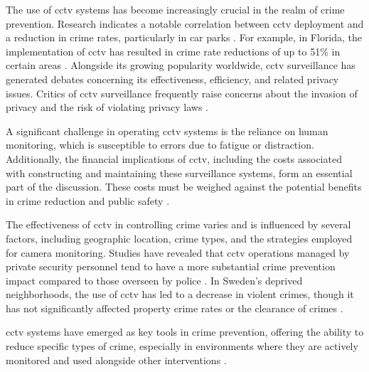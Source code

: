 The use of \ac{cctv} systems has become increasingly crucial in the realm of crime prevention. Research indicates a notable correlation between \ac{cctv} deployment and a reduction in crime rates, particularly in car parks \cite{rfc33}. For example, in Florida, the implementation of \ac{cctv} has resulted in crime rate reductions of up to 51\% in certain areas \cite{rfc34}. Alongside its growing popularity worldwide, \ac{cctv} surveillance has generated debates concerning its effectiveness, efficiency, and related privacy issues. Critics of \ac{cctv} surveillance frequently raise concerns about the invasion of privacy and the risk of violating privacy laws \cite{rfc38}.

A significant challenge in operating \ac{cctv} systems is the reliance on human monitoring, which is susceptible to errors due to fatigue or distraction. Additionally, the financial implications of \ac{cctv}, including the costs associated with constructing and maintaining these surveillance systems, form an essential part of the discussion. These costs must be weighed against the potential benefits in crime reduction and public safety \cite{rfc38}. 

The effectiveness of \ac{cctv} in controlling crime varies and is influenced by several factors, including geographic location, crime types, and the strategies employed for camera monitoring. Studies have revealed that \ac{cctv} operations managed by private security personnel tend to have a more substantial crime prevention impact compared to those overseen by police \cite{rfc36}. In Sweden's deprived neighborhoods, the use of \ac{cctv} has led to a decrease in violent crimes, though it has not significantly affected property crime rates or the clearance of crimes \cite{rfc35}.

\ac{cctv} systems have emerged as key tools in crime prevention, offering the ability to reduce specific types of crime, especially in environments where they are actively monitored and used alongside other interventions \cite{rfc35}. 
